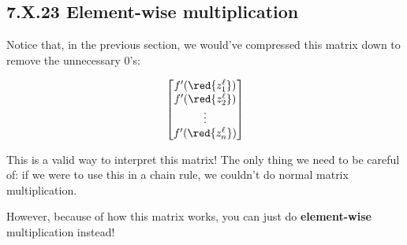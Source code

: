     
    \subsection*{7.X.23 \quad Element-wise multiplication}

        Notice that, in the previous section, we would've compressed this matrix down to remove the unnecessary 0's:
        
        \begin{equation}
            \begin{bmatrix}
                f'({\red{z_1^\ell}})\\
                f'({\red{z_2^\ell}})\\
                \vdots \\
                f'({\red{z_n^\ell}})
            \end{bmatrix}
        \end{equation}
        
        This is a valid way to interpret this matrix! The only thing we need to be careful of: if we were to use this in a chain rule, we couldn't do normal matrix multiplication.
        
        However, because of how this matrix works, you can just do \textbf{element-wise} multiplication instead!
            
